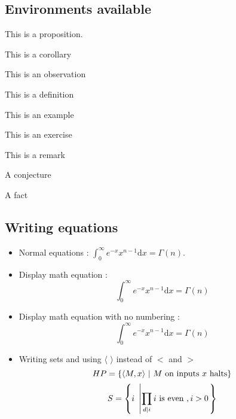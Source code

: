 \subsection{Environments available}
\begin{proposition}
This is a proposition.
\end{proposition}
\begin{corollary}
	This is a corollary
\end{corollary}
\begin{observation}
	This is an observation
\end{observation}
\begin{definition}
	This is a definition
\end{definition}
\begin{example}
	This is an example
\end{example}
\begin{exercise}
	This is an exercise
\end{exercise}
\begin{remark}
	This is a remark
\end{remark}
\begin{conjecture}
	A conjecture
\end{conjecture}

\begin{fact}
	A fact
\end{fact}


\subsection{Writing equations}
\begin{itemize}
\item Normal equations : 
	$\int_0^\infty e^{-x} x^{n-1} \mathrm{d}x = \Gamma(n)$.
\item Display math equation : 
	\begin{equation}
	\int_0^\infty e^{-x} x^{n-1} \mathrm{d}x = \Gamma(n)
	\end{equation}
\item Display math equation with no numbering : 
	\begin{equation*}
	\int_0^\infty e^{-x} x^{n-1} \mathrm{d}x = \Gamma(n)
	\end{equation*}
\item Writing sets and using $\langle$ $\rangle$ instead of $<$ and $>$
	\begin{equation}
	HP = {\left\{  \langle M,x \rangle ~|~ \text{$M$ on inputs $x$ halts}  \right\}}
	\end{equation}
	\begin{equation}
	S =  {\left\{  i ~\left |  \prod_{d | i} i \text{ is even }, i > 0 \right .  \right\}}
	\end{equation}
\end{itemize}


